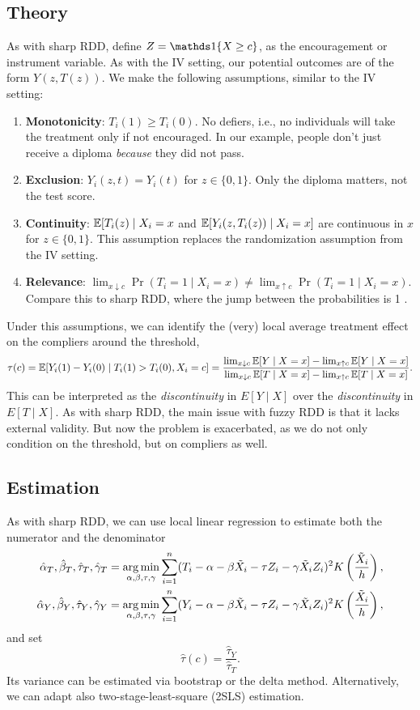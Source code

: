 \documentclass[11pt]{exam}
\begin{document}
\subsection{Theory}
As with sharp RDD, define $Z = \indicator{X \geq c}$, as the encouragement or instrument variable. As with the IV setting, our potential outcomes are of the form $Y(z, T(z))$. We make the following assumptions, similar to the IV setting:
\begin{enumerate}
    \item \textbf{Monotonicity}: $T_i(1) \geq T_i(0)$. No defiers, i.e., no individuals will take the treatment only if not encouraged. In our example, people don't just receive a diploma \emph{because} they did not pass.
    \item \textbf{Exclusion}: $Y_i(z, t) = Y_i(t)$ for $z \in \{0, 1\}$. Only the diploma matters, not the test score.
    \item \textbf{Continuity}: $\mathbb{E}[T_i(z) \mid X_i = x$ and $\mathbb{E}[Y_i(z, T_i(z)) \mid X_i = x]$ are continuous in $x$ for $z \in \{0, 1\}$. This assumption replaces the randomization assumption from the IV setting.
    \item \textbf{Relevance}: $\lim_{x \downarrow c} \Pr(T_i = 1 \mid X_i = x) \neq \lim_{x \uparrow c}\Pr(T_i = 1 \mid X_i = x)$. Compare this to sharp RDD, where the jump between the probabilities is 1 \citep{imbens2008regression}.
\end{enumerate}
Under this assumptions, we can identify the (very) local average treatment effect on the compliers around the threshold,
\[
    \tau(c) = \mathbb{E}[Y_i(1) - Y_i(0) \mid T_i(1) > T_i(0), X_i = c] =
    \frac{\lim_{x \downarrow c} \mathbb{E}[Y \mid X = x] - \lim_{x \uparrow c} \mathbb{E}[Y \mid X = x]}{\lim_{x \downarrow c} \mathbb{E}[T \mid X = x] - \lim_{x \uparrow c} \mathbb{E}[T \mid X = x]}.
\]
This can be interpreted as the \emph{discontinuity} in $E[Y\mid X]$ over the \emph{discontinuity} in $E[T\mid X]$.
As with sharp RDD, the main issue with fuzzy RDD is that it lacks external validity. But now the problem is exacerbated, as we do not only condition on the threshold, but on compliers as well.

\subsection{Estimation}
As with sharp RDD, we can use local linear regression to estimate both the numerator and the denominator
\begin{align*}
    \hat \alpha_T, \hat \beta_T, \hat \tau_T, \hat \gamma_T &= \operatorname*{arg\,min}_{\alpha, \beta, \tau, \gamma} \sum_{i=1}^n (T_i - \alpha - \beta \tilde X_i - \tau Z_i - \gamma \tilde X_i Z_i)^2K\left(\frac{\tilde X_i}{h}\right),
    \\
    \hat \alpha_Y, \hat \beta_Y, \hat \tau_Y, \hat \gamma_Y &= \operatorname*{arg\,min}_{\alpha, \beta, \tau, \gamma} \sum_{i=1}^n (Y_i - \alpha - \beta \tilde X_i - \tau Z_i - \gamma \tilde X_i Z_i)^2 K\left(\frac{\tilde X_i}{h}\right),
\end{align*}
and set 
\[
    \hat \tau(c) = \frac{\hat \tau_Y}{\hat \tau_T}.
\]
Its variance can be estimated via bootstrap or the delta method. Alternatively, we can adapt also two-stage-least-square (2SLS) estimation.


\endgroup

\newpage


\end{document}
